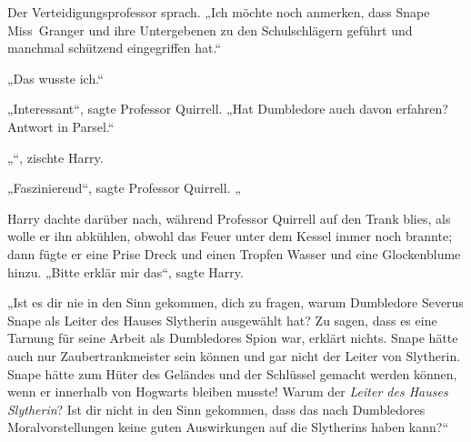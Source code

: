 Der Verteidigungsprofessor sprach.
„Ich möchte noch anmerken, dass Snape Miss~Granger und ihre Untergebenen zu den Schulschlägern geführt und manchmal schützend eingegriffen hat.“

„Das wusste ich.“

„Interessant“, sagte Professor Quirrell.
„Hat Dumbledore auch davon erfahren? Antwort in Parsel.“

„“, zischte Harry.

„Faszinierend“, sagte Professor Quirrell. „

Harry dachte darüber nach, während Professor Quirrell auf den Trank blies, als wolle er ihn abkühlen, obwohl das Feuer unter dem Kessel immer noch brannte; dann fügte er eine Prise Dreck und einen Tropfen Wasser und eine Glockenblume hinzu.
„Bitte erklär mir das“, sagte Harry.

„Ist es dir nie in den Sinn gekommen, dich zu fragen, warum Dumbledore Severus Snape als Leiter des Hauses Slytherin ausgewählt hat? Zu sagen, dass es eine Tarnung für seine Arbeit als Dumbledores Spion war, erklärt nichts. Snape hätte auch nur Zaubertrankmeister sein können und gar nicht der Leiter von Slytherin. Snape hätte zum Hüter des Geländes und der Schlüssel gemacht werden können, wenn er innerhalb von Hogwarts bleiben musste! Warum der \emph{Leiter des Hauses Slytherin}? Ist dir nicht in den Sinn gekommen, dass das nach Dumbledores Moralvorstellungen keine guten Auswirkungen auf die Slytherins haben kann?“


